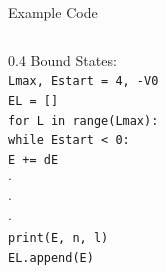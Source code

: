 \documentclass{beamer}
\begin{document}
\begin{frame}{Example Code}
\begin{columns}
    \begin{column}{0.4\textwidth}
    \large{Bound States:}
        \\
        \vspace{.2cm}
        \small{
        \texttt{Lmax, Estart = 4, -V0  %
        } \\
        \texttt{EL = []} \\
        \texttt{for L in range(Lmax):} \\
        \hspace{0.5cm} \texttt{while Estart < 0:} \\
        \hspace{0.5cm} \hspace{0.5cm} \texttt{E += dE} \\
        \hspace{0.5cm} \hspace{1cm} \texttt{$\cdot$} \\
        \hspace{0.5cm} \hspace{1cm} \texttt{$\cdot$} \\
        \hspace{0.5cm} \hspace{1cm} \texttt{$\cdot$} \\
        \hspace{0.5cm} \hspace{0.5cm} \texttt{print(E, n, l)} \\
        \hspace{0.5cm} \texttt{EL.append(E)} \\
        }

    \end{column}


\end{columns}
\end{frame}
\end{document}
